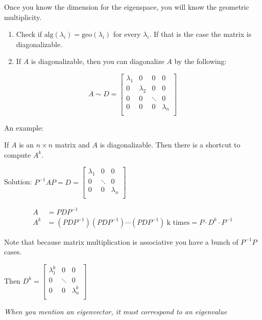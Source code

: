 \documentclass[12pt]{article}
\theoremstyle{plain}
\theoremstyle{remark}
\theoremstyle{definition}
\begin{document}
Once you know the dimension for the eigenspace, you will know the
geometric multiplicity.

\begin{enumerate}
\def\labelenumi{\arabic{enumi}.}
\setcounter{enumi}{2}
\item
  Check if
  \(\text{alg}\left( \lambda_{i} \right) = \text{geo}\left( \lambda_{i} \right)\)
  for every \(\lambda_{i}\). If that is the case the matrix is
  diagonalizable.
\item
  If \(A\) is diagonalizable, then you can diagonalize \(A\) by the
  following:
\end{enumerate}

\[A\sim D = \begin{bmatrix}
\lambda_{1} & 0 & 0 & 0 \\
0 & \lambda_{2} & 0 & 0 \\
0 & 0 & \ddots & 0 \\
0 & 0 & 0 & \lambda_{n} \\
\end{bmatrix}\]

An example:

If \(A\) is an \(n \times n\) matrix and \(A\) is diagonalizable. Then
there is a shortcut to compute \(A^{k}\).

Solution: \(P^{- 1}AP = D = \begin{bmatrix}
\lambda_{1} & 0 & 0 \\
0 & \ddots & 0 \\
0 & 0 & \lambda_{n} \\
\end{bmatrix}\)

\begin{align*}
A &= PDP^{- 1} \\
A^{k} &= \left( PDP^{- 1} \right)\left( PDP^{- 1} \right)\cdots\left( PDP^{- 1} \right)\ \text{k\ times} = P \cdot D^{k} \cdot P^{- 1}
\end{align*}


Note that because matrix multiplication is associative you have a bunch
of \(P^{- 1}P\) cases.

Then \(D^{k} = \begin{bmatrix}
\lambda_{1}^{k} & 0 & 0 \\
0 & \ddots & 0 \\
0 & 0 & \lambda_{n}^{k} \\
\end{bmatrix}\)

\emph{When you mention an eigenvector, it must correspond to an
eigenvalue}
\end{document}
